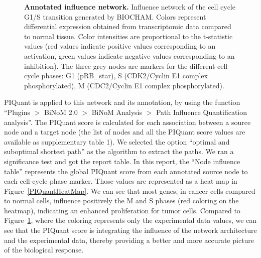 \documentclass[10pt]{bmc_article}
\newenvironment{bmcformat}{\baselineskip20pt\sloppy\setboolean{publ}{false}}{\baselineskip20pt\sloppy}
\begin{document}
\begin{bmcformat}
\begin{figure}[h]
  \caption{\label{InflAnnotNet} \textbf{Annotated influence network.}
    Influence network of the cell cycle G1/S transition generated by BIOCHAM. Colors represent
differential
expression obtained from transcriptomic data compared to normal tissue. Color
intensities are proportional to the t-statistic values (red values indicate
positive values corresponding to an activation, green values indicate negative
values corresponding to an inhibition). The three grey nodes are markers for the
different cell cycle phases: G1 (pRB\_star), S (CDK2/Cyclin E1 complex phosphorylated), M (CDC2/Cyclin E1 complex phosphorylated).}
\end{figure}

PIQuant is applied to this network and its annotation, by using the function
``Plugins $>$ BiNoM 2.0 $>$ BiNoM Analysis $>$ Path Influence Quantification
analysis''. The PIQuant score is calculated for each association
between a source node and a target node (the list of nodes and all the PIQuant
score values are available as supplementary table 1). We selected the option ``optimal and
suboptimal shortest path'' as the algorithm to extract the paths. We ran a
significance test and got the report table. In this report, the ``Node influence
table'' represents the global PIQuant score from each annotated source node to
each cell-cycle phase marker. Those values are
represented as a heat map in Figure~\ref{PIQuantHeatMap}. We can see that most
genes, in cancer cells compared to normal cells, influence positively the M and S phases (red
coloring on the heatmap), indicating an enhanced proliferation for tumor cells.
Compared to Figure~\ref{InflAnnotNet}, where the coloring represents only the
experimental data values, we can see that the PIQuant score is integrating the
influence of the network architecture and the experimental data, thereby
providing a better and more accurate picture of the biological response.



\end{bmcformat}
\end{document}
